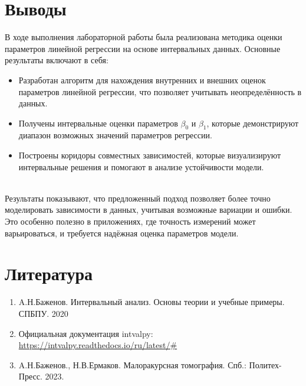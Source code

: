 \documentclass[10pt]{article}
\begin{document}
\section{Выводы}
  В ходе выполнения лабораторной работы была реализована методика оценки
  параметров линейной регрессии на основе интервальных данных. Основные
  результаты включают в себя:

  \begin{itemize}
    \item Разработан алгоритм для нахождения внутренних и внешних оценок
      параметров линейной регрессии, что позволяет учитывать
      неопределённость в данных.
    \item Получены интервальные оценки параметров \( \beta_0 \) и
      \( \beta_1 \), которые демонстрируют диапазон возможных значений
      параметров регрессии.
    \item Построены коридоры совместных зависимостей, которые
      визуализируют интервальные решения и помогают в анализе устойчивости
      модели.
  \end{itemize}\\
  Результаты показывают, что предложенный подход позволяет более точно
  моделировать зависимости в данных, учитывая возможные вариации и ошибки.
  Это особенно полезно в приложениях, где точность измерений может
  варьироваться, и требуется надёжная оценка параметров модели.
\section{Литература}
\begin{enumerate}
    \item A.Н.Баженов. Интервальный анализ. Основы теории и учебные примеры. СПБПУ. 2020
    \item Официальная документация intvalpy: \url{https://intvalpy.readthedocs.io/ru/latest/#} 
    \item A.Н.Баженов., Н.В.Ермаков. Малоракурсная томография. Спб.: Политех-Пресс. 2023.  
\end{enumerate}
\end{document}
